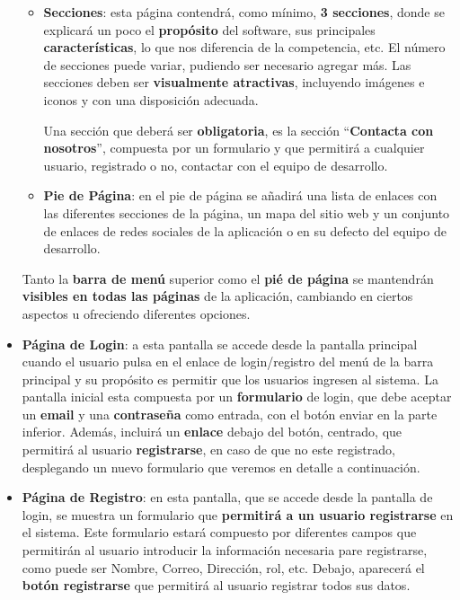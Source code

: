 \begin{appendices}
\begin{itemize}
\begin{itemize}
		\item \textbf{Secciones}: esta página contendrá, como mínimo, \textbf{3 secciones}, donde se explicará un poco el \textbf{propósito} del software, sus principales \textbf{características}, lo que nos diferencia de la competencia, etc. El número de secciones puede variar, pudiendo ser necesario agregar más.  Las secciones deben ser \textbf{visualmente atractivas}, incluyendo imágenes e iconos y con una disposición adecuada. 
		
		Una sección que deberá ser \textbf{obligatoria}, es la sección ``\textbf{Contacta con nosotros}'', compuesta por un formulario y que permitirá a cualquier usuario, registrado o no, contactar con el equipo de desarrollo.
		
		\item \textbf{Pie de Página}: en el pie de página se añadirá una lista de enlaces con las diferentes secciones de la página, un mapa del sitio web y un conjunto de enlaces de redes sociales de la aplicación o en su defecto del equipo de desarrollo.
	\end{itemize}
	
	Tanto la \textbf{barra de menú} superior como el \textbf{pié de página} se mantendrán \textbf{visibles en todas las páginas} de la aplicación, cambiando en ciertos aspectos u ofreciendo diferentes opciones.
	
	\item \textbf{Página de Login}: a esta pantalla se accede desde la pantalla principal cuando el usuario pulsa en el enlace de login/registro del menú de la barra principal y su propósito es permitir que los usuarios ingresen al sistema. La pantalla inicial esta compuesta por un \textbf{formulario} de login, que debe aceptar un \textbf{email} y una \textbf{contraseña} como entrada, con el botón enviar en la parte inferior. Además, incluirá un \textbf{enlace} debajo del botón, centrado, que permitirá al usuario \textbf{registrarse}, en caso de que no este registrado, desplegando un nuevo formulario que veremos en detalle a continuación.
	
	\item \textbf{Página de Registro}: en esta pantalla, que se accede desde la pantalla de login, se muestra un formulario que \textbf{permitirá a un usuario registrarse} en el sistema. Este formulario estará compuesto por diferentes campos que permitirán al usuario introducir la información necesaria pare registrarse, como puede ser Nombre, Correo, Dirección, rol, etc. Debajo, aparecerá el \textbf{botón registrarse} que permitirá al usuario registrar todos sus datos.  


\end{itemize}
\end{appendices}
